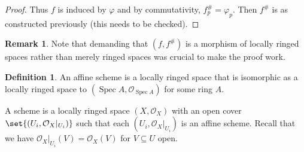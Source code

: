 \documentclass[a4paper]{amsbook}
\theoremstyle{definition}
\newtheorem{definition}{Definition}[chapter]
\newtheorem*{remark*}{Remark}
\DeclareMathOperator\Spec{Spec}
\begin{document}
\begin{proof}[Proof]
Thus $f$ is induced by $\varphi$ and by commutativity, $f_p^\# = \varphi_p$.
Then $f^\#$ is as constructed previously (this needs to be checked).
\end{proof}

\begin{remark*}
\label{Antiequivalence}
Note that demanding that $(f, f^\#)$ is a morphism of locally ringed spaces rather
than merely ringed spaces was crucial to make the proof work.
\end{remark*}

\begin{definition}
\label{Scheme}
An affine scheme is a locally ringed space that is isomorphic as a locally
ringed space to $(\Spec A, \mathcal{O}_{\Spec A})$ for some ring $A$.

A scheme is a locally ringed space $(X, \mathcal{O}_X)$ with an open cover
$\set{(U_i, \mathcal{O}_X|_{U_i})}$ such that each $(U_i, \mathcal{O}_X|_{U_i})$
is an affine scheme.  Recall that we have $\mathcal{O}_X|_{U_i}(V) = \mathcal{O}_X(V)$
for $V \subseteq U$ open.
\end{definition}
\end{document}
